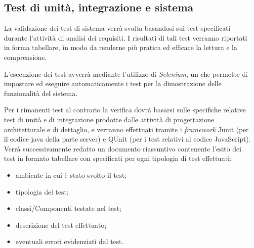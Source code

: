 {\subsection{Test di unità, integrazione e sistema}
La validazione dei test di sistema verrà svolta basandosi sui test specificati durante l'attività di analisi dei requisiti. I risultati di tali test verranno riportati in forma tabellare, in modo da renderne più pratica ed efficace la lettura e la comprensione.

L'esecuzione dei test avverrà mediante l'utilizzo di \textit{Selenium}, un  che permette di impostare ed eseguire automaticamente i test per la dimostrazione delle funzionalità del sistema.

Per i rimanenti test al contrario la verifica dovrà basarsi sulle specifiche relative test di unità e di integrazione prodotte dalle attività di progettazione architetturale e di dettaglio, e verranno effettuati tramite i \textit{framework} Junit (per il codice java della parte server) e QUnit (per i test relativi al codice JavaScript).\\
Verrà successivamente redatto un documento riassuntivo contenente l'esito dei test in formato tabellare con specificati per ogni tipologia di test effettuati:
\begin{itemize}
\item ambiente in cui è stato svolto il test;
\item tipologia del test;
\item classi/Componenti testate nel test;
\item descrizione del test effettuato;
\item eventuali errori evidenziati dal test.
\end{itemize}

}

